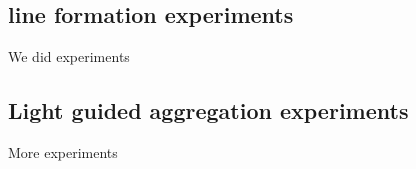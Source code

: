 \subsection{line formation experiments}
\label{sec:mblocksExperimentsLine}

We did experiments


\subsection{Light guided aggregation experiments}
\label{sec:mblocksExperimentsLight}

More experiments
